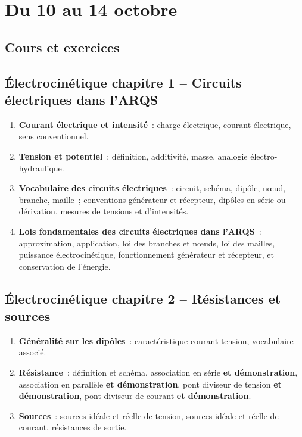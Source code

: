 \documentclass[a4paper, 12pt, final, garamond]{book}
\begin{document}
\setcounter{chapter}{4}

\chapter{Du 10 au 14 octobre}

\section{Cours et exercices}

\section*{Électrocinétique chapitre 1 -- Circuits électriques dans l'ARQS}
\begin{enumerate}[label=\Roman*]
    \item \textbf{Courant électrique et intensité}~: charge électrique, courant
        électrique, sens conventionnel.
    \item \textbf{Tension et potentiel}~: définition, additivité, masse,
        analogie électro-hydraulique.
    \item \textbf{Vocabulaire des circuits électriques}~: circuit, schéma,
        dipôle, nœud, branche, maille~; conventions générateur et récepteur,
        dipôles en série ou dérivation, mesures de tensions et d'intensités.
    \item \textbf{Lois fondamentales des circuits électriques dans l'ARQS}~:
        approximation, application, loi des branches et nœuds, loi des mailles,
        puissance électrocinétique, fonctionnement générateur et récepteur, et
        conservation de l'énergie.
\end{enumerate}

\section*{Électrocinétique chapitre 2 -- Résistances et sources}
\begin{enumerate}[label=\Roman*]
    \item \textbf{Généralité sur les dipôles}~: caractéristique courant-tension,
        vocabulaire associé.
    \item \textbf{Résistance}~: définition et schéma, association en série
        \textbf{et démonstration}, association en parallèle \textbf{et
        démonstration}, pont diviseur de tension \textbf{et démonstration}, pont
        diviseur de courant \textbf{et démonstration}.
    \item \textbf{Sources}~: sources idéale et réelle de tension, sources idéale
        et réelle de courant, résistances de sortie.
\end{enumerate}
\end{document}
